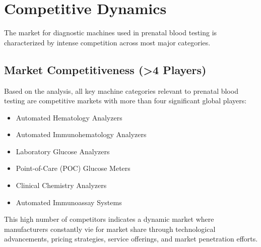 \documentclass{article}
\begin{document}
\section{Competitive Dynamics}
The market for diagnostic machines used in prenatal blood testing is characterized by intense competition across most major categories.

\subsection{Market Competitiveness (>4 Players)}
Based on the analysis, all key machine categories relevant to prenatal blood testing are competitive markets with more than four significant global players:
\begin{itemize}
    \item Automated Hematology Analyzers
    \item Automated Immunohematology Analyzers
    \item Laboratory Glucose Analyzers
    \item Point-of-Care (POC) Glucose Meters
    \item Clinical Chemistry Analyzers
    \item Automated Immunoassay Systems
\end{itemize}
This high number of competitors indicates a dynamic market where manufacturers constantly vie for market share through technological advancements, pricing strategies, service offerings, and market penetration efforts.
\end{document}
